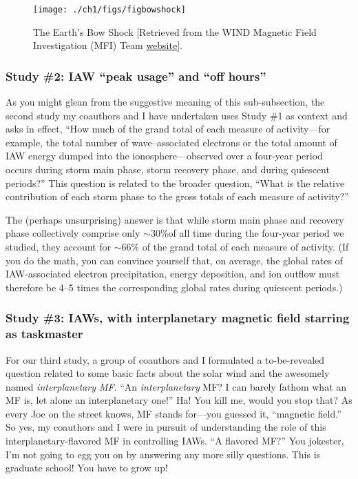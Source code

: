 \begin{figure}
  \centering
  \noindent\texttt{[image: ./ch1/figs/figbowshock]}
  \caption[The Earth's Bow Shock]{The Earth's Bow Shock [Retrieved
    from the WIND Magnetic Field Investigation (MFI) Team
    \href{https://wind.nasa.gov/mfi/team_sciencea.html}{website}].}
  \label{ch1:FigBowShock}
\end{figure}



\subsubsection{Study \#2: IAW ``peak usage'' and ``off hours''}

As you might glean from the suggestive meaning of this sub-subsection, the
second study my coauthors and I have undertaken uses Study \#1 as context and
asks in effect, ``How much of the grand total of each measure of \Alfic
activity---for example, the total number of \Alf wave--associated electrons or
the total amount of IAW energy dumped into the ionosphere---observed over a
four-year period occurs during storm main phase, storm recovery phase, and
during quiescent periods?'' This question is related to the broader question,
``What is the relative contribution of each storm phase to the gross totals of
each measure of \Alfic activity?''

The (perhaps unsurprising) answer is that while storm main phase and recovery
phase collectively comprise only $\sim$30\%of all time during the four-year
period we studied, they account for $\sim$66\% of the grand total of each
measure of \Alfic activity. (If you do the math, you can convince yourself that,
on average, the global rates of IAW-associated electron precipitation, energy
deposition, and ion outflow must therefore be 4--5 times the corresponding
global rates during quiescent periods.)

\subsubsection{Study \#3: IAWs, with interplanetary magnetic field starring as taskmaster}

For our third study, a group of coauthors and I formulated a to-be-revealed
question related to some basic facts about the solar wind and the awesomely
named \emph{interplanetary MF}. ``An \emph{interplanetary} MF? I can barely
fathom what an MF is, let alone an interplanetary one!'' Ha! You kill me, would
you stop that? As every Joe on the street knows, MF stands for---you guessed it,
``magnetic field.'' So yes, my coauthors and I were in pursuit of understanding
the role of this interplanetary-flavored MF in controlling IAWs. ``A flavored
MF?'' You jokester, I'm not going to egg you on by answering any more silly
questions. This is graduate school! You have to grow up!

